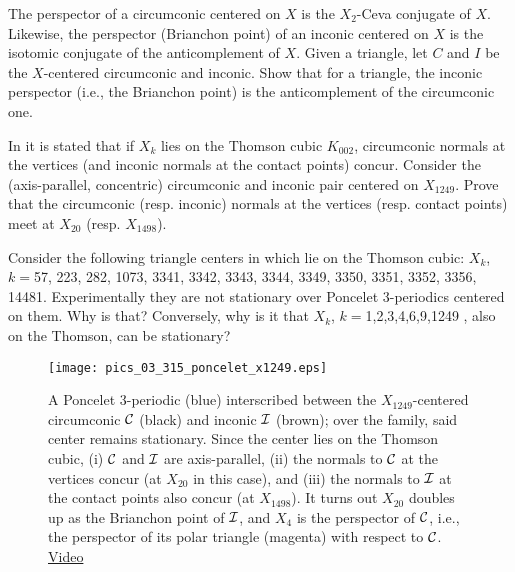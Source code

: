 \begin{question}
The perspector of a circumconic centered on $X$ is the $X_2$-Ceva conjugate of $X$. Likewise, the perspector (Brianchon point) of an inconic centered on $X$ is the isotomic conjugate of the anticomplement of $X$. Given a triangle, let $C$ and $I$ be the $X$-centered circumconic and inconic. Show that for a triangle, the inconic perspector (i.e., the Brianchon point) is the anticomplement of the circumconic one.
\end{question}

\begin{question}
In \cite{gibert2021-thomson} it is stated that if $X_k$ lies on the Thomson cubic $K_{002}$, circumconic normals at the vertices (and inconic normals at the contact points) concur. Consider the (axis-parallel, concentric) circumconic and inconic pair centered on $X_{1249}$. Prove that the circumconic (resp. inconic) normals at the vertices (resp. contact points) meet at $X_{20}$ (resp. $X_{1498}$).
\end{question}

\begin{question}
Consider the following triangle centers in \cite{gibert2021-thomson} which lie on the Thomson cubic: $X_k$, $k=$57, 223, 282, 1073, 3341, 3342, 3343, 3344, 3349, 3350, 3351, 3352, 3356, 14481. Experimentally they are not stationary over Poncelet 3-periodics centered on them. Why is that? Conversely, why is it that $X_k$, $k=$1,2,3,4,6,9,1249 , also on the Thomson, can be stationary?
\end{question}


\begin{figure}
    \centering
    \texttt{[image: pics\_03\_315\_poncelet\_x1249.eps]}
    \caption{A Poncelet 3-periodic (blue) interscribed between the $X_{1249}$-centered circumconic $\mathcal{C}$ (black) and inconic $\mathcal{I}$ (brown); over the family, said center remains stationary. Since the center lies on the Thomson cubic, (i) $\mathcal{C}$ and $\mathcal{I}$ are axis-parallel, (ii) the normals to $\mathcal{C}$ at the vertices concur (at $X_{20}$ in this case), and (iii) the normals to $\mathcal{I}$ at the contact points also concur (at $X_{1498}$). It turns out $X_{20}$ doubles up as the Brianchon point of $\mathcal{I}$, and $X_4$ is the perspector of $\mathcal{C}$, i.e., the perspector of its polar triangle (magenta) with respect to $\mathcal{C}$. \href{https://youtu.be/QQSN\_ndDJQk}{Video}}
    \label{fig:03-x1249}
\end{figure}

